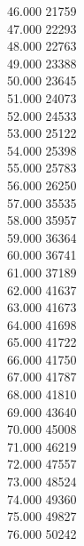 { 46.000	21759 \\
 47.000	22293 \\
 48.000	22763 \\
 49.000	23388 \\
 50.000	23645 \\
 51.000	24073 \\
 52.000	24533 \\
 53.000	25122 \\
 54.000	25398 \\
 55.000	25783 \\
 56.000	26250 \\
 57.000	35535 \\
 58.000	35957 \\
 59.000	36364 \\
 60.000	36741 \\
 61.000	37189 \\
 62.000	41637 \\
 63.000	41673 \\
 64.000	41698 \\
 65.000	41722 \\
 66.000	41750 \\
 67.000	41787 \\
 68.000	41810 \\
 69.000	43640 \\
 70.000	45008 \\
 71.000	46219 \\
 72.000	47557 \\
 73.000	48524 \\
 74.000	49360 \\
 75.000	49827 \\
 76.000	50242 \\
}

